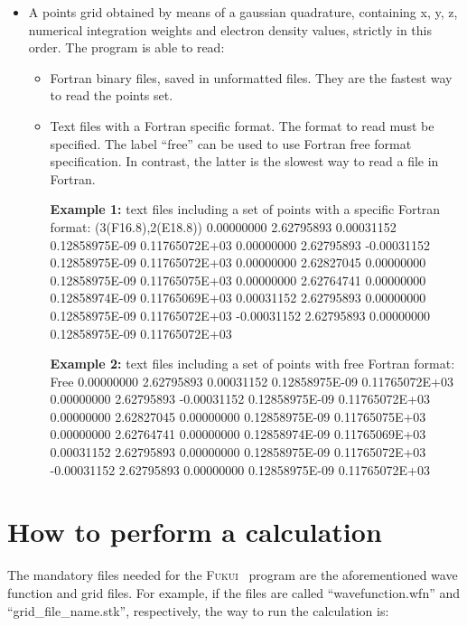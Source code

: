 \documentclass[a4paper,11pt,openany]{memoir}
\newcommand\programa{\textsc{Fukui}}
\begin{document}
\begin{itemize}
\begin{recuadro}{Cube file structure:}
  1.41965E-18  4.15287E-18  1.16752E-17  3.15458E-17  8.19189E-17  2.04457E-16
		\end{recuadro}
	\item A points grid obtained by means of a gaussian quadrature, containing x, y, z, numerical integration weights and electron density values, strictly in this order. The program is able to read:
	\begin{itemize}
		\item Fortran binary files, saved in unformatted files. They are the fastest way to read the points set.
		\item Text files with a Fortran specific format. The format to read must be specified. The label ``free'' can be used to use Fortran free format specification. In contrast, the latter is the slowest way to read a file in Fortran.
		\begin{recuadro}{\textbf{Example 1:} text files including a set of points with a specific Fortran format:}
(3(F16.8),2(E18.8))
      0.00000000      2.62795893      0.00031152    0.12858975E-09   0.11765072E+03
      0.00000000      2.62795893     -0.00031152    0.12858975E-09   0.11765072E+03
      0.00000000      2.62827045      0.00000000    0.12858975E-09   0.11765075E+03
      0.00000000      2.62764741      0.00000000    0.12858974E-09   0.11765069E+03
      0.00031152      2.62795893      0.00000000    0.12858975E-09   0.11765072E+03
     -0.00031152      2.62795893      0.00000000    0.12858975E-09   0.11765072E+03
		\end{recuadro}
		\begin{recuadro}{\textbf{Example 2:}  text files including a set of points with free Fortran format:}
Free
      0.00000000      2.62795893      0.00031152    0.12858975E-09   0.11765072E+03
      0.00000000      2.62795893     -0.00031152    0.12858975E-09   0.11765072E+03
      0.00000000      2.62827045      0.00000000    0.12858975E-09   0.11765075E+03
      0.00000000      2.62764741      0.00000000    0.12858974E-09   0.11765069E+03
      0.00031152      2.62795893      0.00000000    0.12858975E-09   0.11765072E+03
     -0.00031152      2.62795893      0.00000000    0.12858975E-09   0.11765072E+03
		\end{recuadro}
	\end{itemize}
\end{itemize}

\section{How to perform a calculation}
The mandatory files needed for the \programa~ program are the aforementioned wave function and grid files. For example, if the files are called ``wavefunction.wfn'' and ``grid\_file\_name.stk'', respectively, the way to run the calculation is:
\end{document}
